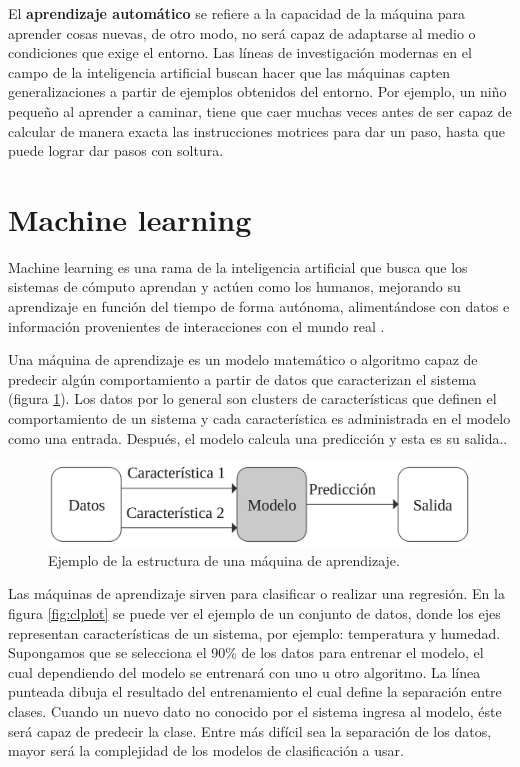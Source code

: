 \documentclass[twoside,spanish,ESP,MSc]{plantillaLabUPV}
\theoremstyle{definition}
\begin{document}
El \textbf{aprendizaje automático} se refiere a la capacidad de la máquina para aprender cosas nuevas, de otro modo, no será capaz de adaptarse al medio o condiciones que exige el entorno. Las líneas de investigación modernas en el campo de la inteligencia artificial buscan hacer que las máquinas capten generalizaciones a partir de ejemplos obtenidos del entorno. Por ejemplo, un niño pequeño al aprender a caminar, tiene que caer muchas veces antes de ser capaz de calcular de manera exacta las instrucciones motrices para dar un paso, hasta que puede lograr dar pasos con soltura.


\section{Machine learning}

Machine learning es una rama de la inteligencia artificial que busca que los sistemas de cómputo aprendan y actúen como los humanos, mejorando su aprendizaje en función del tiempo de forma autónoma, alimentándose con datos e información provenientes de interacciones con el mundo real \cite{supervisadobook}.

Una máquina de aprendizaje es un modelo matemático o algoritmo capaz de predecir algún comportamiento a partir de datos que caracterizan el sistema (figura \ref{fml}). Los datos por lo general son clusters de características que definen el comportamiento de un sistema y cada característica es administrada en el modelo como una entrada. Después, el modelo calcula una predicción y esta es su salida..

\begin{figure}[!tbh] 
	\centering 
		\includegraphics[scale=.30]{ima_mc/flujoml} 
	\caption{Ejemplo de la estructura de una máquina de aprendizaje.} 
	\label{fml} 
\end{figure}

Las máquinas de aprendizaje sirven para clasificar o realizar una regresión. En la figura \ref{fig:clplot} se puede ver el ejemplo de un conjunto de datos, donde los ejes representan características de un sistema, por ejemplo: temperatura y humedad. Supongamos que se selecciona el 90\% de los datos para entrenar el modelo, el cual dependiendo del modelo se entrenará con uno u otro algoritmo.
La línea punteada dibuja el resultado del entrenamiento el cual define la separación entre clases. Cuando un nuevo dato no conocido por el sistema ingresa al modelo, éste será capaz de predecir la clase. Entre más difícil sea la separación de los datos, mayor será la complejidad de los modelos de clasificación a usar.
\end{document}
